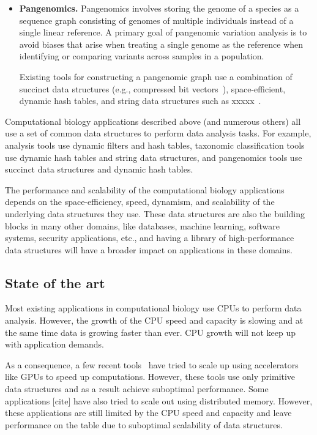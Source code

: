 \begin{itemize}[leftmargin=*]



\item {\bf Pangenomics.} 
Pangenomics involves storing the genome of a species as a sequence graph consisting of genomes of multiple individuals instead of a single linear reference. A primary goal of pangenomic variation analysis is to avoid biases that arise when treating a single genome as the reference when identifying or comparing variants across samples in a population.

Existing tools for  constructing a pangenomic graph use a combination of succinct data structures (e.g., compressed bit vectors~\cite{xxx}), space-efficient, dynamic hash tables, and string data structures such as xxxxx~\cite{xxx}.

\end{itemize}


Computational biology applications described above (and numerous others) all use
a set of common data structures to perform data analysis tasks. For example,
\kmer analysis tools use dynamic filters and hash tables, taxonomic
classification tools use dynamic hash tables and string data structures, and
pangenomics tools use succinct data structures and dynamic hash tables.

The performance and scalability of the computational biology applications
depends on the space-efficiency, speed, dynamism, and scalability of the
underlying data structures they use. These data structures are also the building
blocks in many other domains, like databases, machine learning, software
systems, security applications, etc., and having a library of high-performance
data structures will have a broader impact on applications in these domains.

\subsection{State of the art}

Most existing applications in computational biology use CPUs to perform data
analysis. However, the growth of the CPU speed and capacity is slowing and at
the same time data is growing faster than ever. CPU growth will not keep up with
application demands.

As a consequence, a few recent tools~\cite{cite-something} have tried to scale
up using accelerators like GPUs to speed up computations. However, these tools
use only primitive data structures and as a result achieve suboptimal
performance. Some applications [cite] have also tried to scale out using
distributed memory.  However, these applications are still limited by the CPU
speed and capacity and leave performance on the table due to suboptimal
scalability of data structures.

